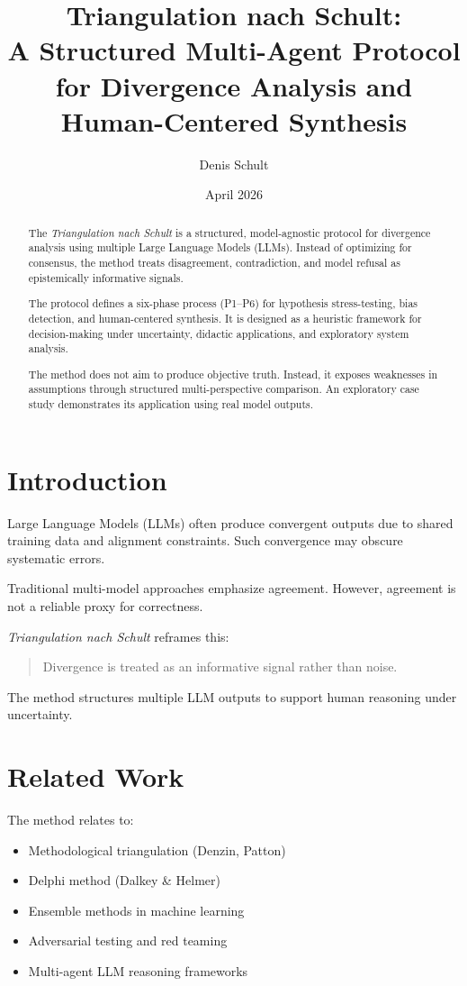 \documentclass[11pt]{article}
\title{Triangulation nach Schult:\\
A Structured Multi-Agent Protocol for Divergence Analysis and Human-Centered Synthesis}
\author{Denis Schult}
\date{April 2026}
\begin{document}
\maketitle

\begin{abstract}
The \textit{Triangulation nach Schult} is a structured, model-agnostic protocol for divergence analysis using multiple Large Language Models (LLMs). 
Instead of optimizing for consensus, the method treats disagreement, contradiction, and model refusal as epistemically informative signals.

The protocol defines a six-phase process (P1--P6) for hypothesis stress-testing, bias detection, and human-centered synthesis.
It is designed as a heuristic framework for decision-making under uncertainty, didactic applications, and exploratory system analysis.

The method does not aim to produce objective truth. Instead, it exposes weaknesses in assumptions through structured multi-perspective comparison.
An exploratory case study demonstrates its application using real model outputs.
\end{abstract}

\section{Introduction}

Large Language Models (LLMs) often produce convergent outputs due to shared training data and alignment constraints.
Such convergence may obscure systematic errors.

Traditional multi-model approaches emphasize agreement.
However, agreement is not a reliable proxy for correctness.

\textit{Triangulation nach Schult} reframes this:

\begin{quote}
Divergence is treated as an informative signal rather than noise.
\end{quote}

The method structures multiple LLM outputs to support human reasoning under uncertainty.

\section{Related Work}

The method relates to:

\begin{itemize}
\item Methodological triangulation (Denzin, Patton)
\item Delphi method (Dalkey \& Helmer)
\item Ensemble methods in machine learning
\item Adversarial testing and red teaming
\item Multi-agent LLM reasoning frameworks
\end{itemize}
\end{document}
